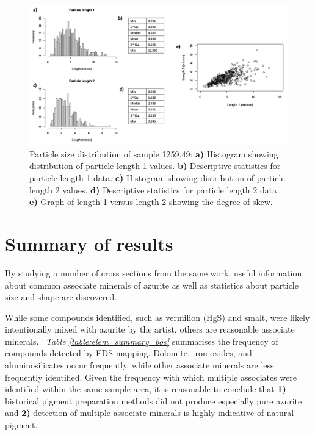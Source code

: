 \begin{figure}[H]
\centering
  \includegraphics[width=\linewidth]{1259-49_partsize}
\caption[Particle size distribution, sample 1259.49.]{Particle size distribution of sample 1259.49: \textbf{a)} Histogram showing distribution of particle length 1 values. \textbf{b)} Descriptive statistics for particle length 1 data. \textbf{c)} Histogram showing distribution of particle length 2 values. \textbf{d)} Descriptive statistics for particle length 2 data. \textbf{e)} Graph of length 1 versus length 2 showing the degree of skew.}
\label{fig:1259.49_partsize}
\end{figure}

\section{Summary of results}

By studying a number of cross sections from the same work, useful information about common associate minerals of azurite as well as statistics about particle size and shape are discovered. 

While some compounds identified, such as vermilion (HgS) and smalt, were likely intentionally mixed with azurite by the artist, others are reasonable associate minerals.~\autocite{Aru} \textit{Table \ref{table:elem_summary_bos}} summarises the frequency of compounds detected by EDS mapping. Dolomite, iron oxides, and aluminosilicates occur frequently, while other associate minerals are less frequently identified. Given the frequency with which multiple associates were identified within the same sample area, it is reasonable to conclude that \textbf{1)} historical pigment preparation methods did not produce especially pure azurite and \textbf{2)} detection of multiple associate minerals is highly indicative of natural pigment.


